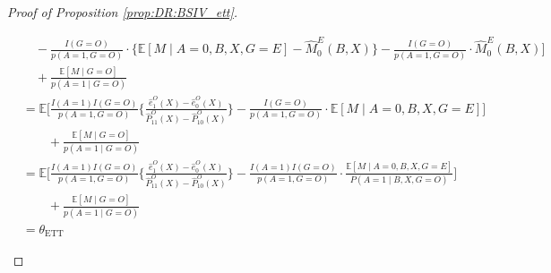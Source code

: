 \documentclass[10pt]{article}
\newcommand{\E}{\mathbb{E}}
\begin{document}
\begin{proof}[Proof of Proposition \ref{prop:DR:BSIV_ett}]
\begin{itemize}
{\begin{align*}
&\quad-\frac{I(G=O)}{p(A=1,G=O)}\cdot
\{\mathbb{E}[M\mid A=0,B,X,G=E]-\hat{M}_{0}^{E}(B,X)\}-\frac{I(G=O)}{p(A=1,G=O)}\cdot \hat{M}_{0}^{E}(B,X)\Big]\\
&\quad+\frac{\mathbb{E}[M\mid G=O]}{p(A=1\mid G=O)}\\
&=\E\Big[\frac{I(A=1)I(G=O)}{p(A=1,G=O)}\Big\{\frac{\hat{e}_1^O(X)-\hat{e}_0^O(X)}{\hat{P}_{11}^O(X)-\hat{P}_{10}^O(X)}\Big\}-\frac{I(G=O)}{p(A=1,G=O)}\cdot
\mathbb{E}[M\mid A=0,B,X,G=E]\Big]\\
&\quad\quad+\frac{\mathbb{E}[M\mid G=O]}{p(A=1\mid G=O)}\\
&=\E\Big[\frac{I(A=1)I(G=O)}{p(A=1,G=O)}\Big\{\frac{\hat{e}_1^O(X)-\hat{e}_0^O(X)}{\hat{P}_{11}^O(X)-\hat{P}_{10}^O(X)}\Big\}-\frac{I(A=1)I(G=O)}{p(A=1,G=O)}\cdot\frac{
\mathbb{E}[M\mid A=0,B,X,G=E]}{P(A=1\mid B,X,G=O)}\Big]\\
&\quad\quad+\frac{\mathbb{E}[M\mid G=O]}{p(A=1\mid G=O)}\\
&=\theta_{\text{ETT}}
\end{align*}}
\endgroup


\end{itemize}
\end{proof}
\end{document}
